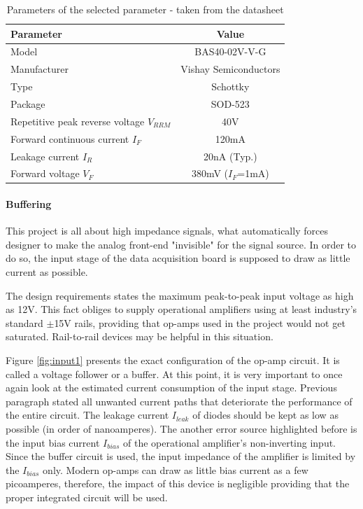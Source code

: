 \documentclass[12pt,a4paper]{article}
\begin{document}
\begin{table}[ht!]
\begin{tabular}{|l|c|}
\hline
\textbf{Parameter}		& \textbf{Value} 	\\ \hline
Model  			& BAS40-02V-V-G         	\\ \hline
Manufacturer    & Vishay Semiconductors	\\ \hline
Type           	& Schottky  			\\ \hline
Package &  SOD-523		\\ \hline
Repetitive peak reverse voltage $V_{RRM}$ &  40V \\ \hline
Forward continuous current $I_{F}$ &  120mA \\ \hline
Leakage current $I_{R}$ &  20nA (Typ.) \\ \hline
Forward voltage $V_{F}$ &  380mV ($I_F$=1mA) \\ \hline
\end{tabular}
\caption{Parameters of the selected parameter - taken from the datasheet \cite{bas40_params}}
\label{tab:bas40_params}
\end{table}

\paragraph{Buffering}

This project is all about high impedance signals, what automatically forces designer to make the analog front-end "invisible" for the signal source. In order to do so, the input stage of the data acquisition board is supposed to draw as little current as possible. 
\par

The design requirements states the maximum peak-to-peak input voltage as high as 12V. This fact obliges to supply operational amplifiers using at least industry's standard $\pm$15V rails, providing that op-amps used in the project would not get saturated. Rail-to-rail devices may be helpful in this situation.
\par
Figure \ref{fig:input1} presents the exact configuration of the op-amp circuit. It is called a voltage follower or a buffer. At this point, it is very important to once again look at the estimated current consumption of the input stage. Previous paragraph stated all unwanted current paths that deteriorate the performance of the entire circuit. The leakage current $I_{leak}$ of diodes should be kept as low as possible (in order of nanoamperes). The another error source highlighted before is the input bias current $I_{bias}$ of the operational amplifier's non-inverting input. Since the buffer circuit is used, the input impedance of the amplifier is limited by the $I_{bias}$ only. Modern op-amps can draw as little bias current as a few picoamperes, therefore, the impact of this device is negligible providing that the proper integrated circuit will be used.
\par
\end{document}

